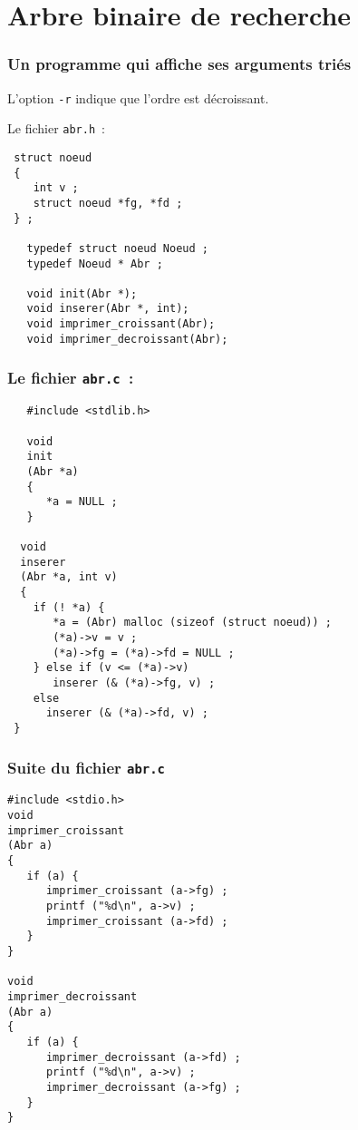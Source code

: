 \section{Arbre binaire de recherche}%
\begin{frame}[fragile]
 \frametitle{Un programme qui affiche ses arguments tri\'es}%
 L'option {\tt -r} indique que l'ordre est d\'ecroissant.
 \par\medskip
Le fichier {\tt abr.h}~:
\begin{verbatim}
 struct noeud 
 {
    int v ;
    struct noeud *fg, *fd ;
 } ;

   typedef struct noeud Noeud ;
   typedef Noeud * Abr ;

   void init(Abr *);
   void inserer(Abr *, int);
   void imprimer_croissant(Abr);
   void imprimer_decroissant(Abr);
\end{verbatim}
\end{frame}
\begin{frame}[fragile]
  \frametitle{Le fichier {\tt abr.c}~:}%
\begin{verbatim}
   #include <stdlib.h>

   void 
   init 
   (Abr *a)
   {
      *a = NULL ;
   }

  void 
  inserer 
  (Abr *a, int v)
  {
    if (! *a) {
       *a = (Abr) malloc (sizeof (struct noeud)) ;
       (*a)->v = v ;
       (*a)->fg = (*a)->fd = NULL ;
    } else if (v <= (*a)->v)
       inserer (& (*a)->fg, v) ;
    else
      inserer (& (*a)->fd, v) ;
 }
\end{verbatim}
\end{frame}
\begin{frame}[fragile]
  \frametitle{Suite du fichier {\tt abr.c}}%
\begin{verbatim}
#include <stdio.h>
void 
imprimer_croissant 
(Abr a)
{
   if (a) {
      imprimer_croissant (a->fg) ;
      printf ("%d\n", a->v) ;
      imprimer_croissant (a->fd) ;
   }
}

void 
imprimer_decroissant 
(Abr a)
{
   if (a) {
      imprimer_decroissant (a->fd) ;
      printf ("%d\n", a->v) ;
      imprimer_decroissant (a->fg) ;
   }
}
\end{verbatim}
\end{frame}
